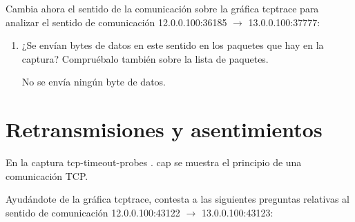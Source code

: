 \documentclass[12pt, a4paper]{report}
\begin{document}
Cambia ahora el sentido de la comunicación sobre la gráfica tcptrace para analizar el sentido de comunicación 12.0.0.100:36185 $\rightarrow$ 13.0.0.100:37777:

\begin{enumerate}
	\item ¿Se envían bytes de datos en este sentido en los paquetes que hay en la captura? Compruébalo también sobre la lista de paquetes.
	
	No se envía ningún byte de datos.
\end{enumerate}

\section{Retransmisiones y asentimientos}
En la captura tcp-timeout-probes . cap se muestra el principio de una comunicación TCP.

Ayudándote de la gráfica tcptrace, contesta a las siguientes preguntas relativas al sentido de comunicación 12.0.0.100:43122 $\rightarrow$ 13.0.0.100:43123:
\end{document}
